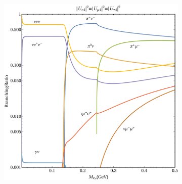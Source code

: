 \documentclass[11pt, a4paper]{article}
\def\ster{\ensuremath N}
\begin{document}
%

\begin{figure}[t]
\centering
\begin{subfigure}{.5\textwidth}
  \centering
  \includegraphics[width=\linewidth]{figures/BR_notlog_square.pdf}
\end{subfigure}%
\begin{subfigure}{.5\textwidth}
 \centering

\end{subfigure}
\end{figure}
\end{document}
